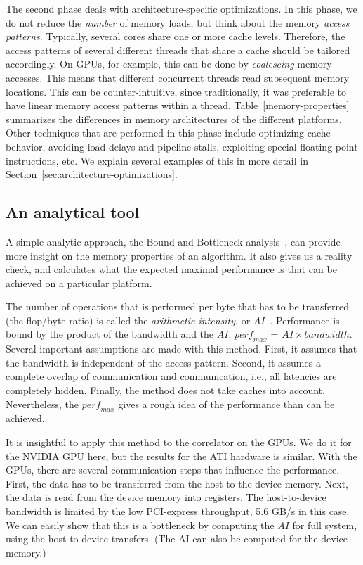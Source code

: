 \documentclass{article}
\begin{document}
The second phase deals with architecture-specific optimizations.
In this phase, we do not reduce the \emph{number} of memory loads, but think about the
memory \emph{access patterns}. Typically, several cores share one or
more cache levels. Therefore, the access patterns of several different
threads that share a cache should be tailored accordingly. On GPUs,
for example, this can be done by \emph{coalescing} memory accesses.
This means that different concurrent threads read subsequent memory
locations.  This can be counter-intuitive, since traditionally, it was
preferable to have linear memory access patterns within a
thread. Table~\ref{memory-properties} summarizes the differences in
memory architectures of the different platforms.
Other techniques that are performed in this phase include optimizing cache
behavior, avoiding load delays and pipeline stalls, exploiting special floating-point instructions, etc.
We explain several examples of this in more detail in Section~\ref{sec:architecture-optimizations}.


\subsection{An analytical tool}

A simple analytic approach, the Bound and Bottleneck
analysis~\cite{system-performance,roofline}, can provide more insight
on the memory properties of an algorithm. It also gives us a reality
check, and calculates what the expected maximal performance is that can be
achieved on a particular platform.

The number of operations that is performed per byte that has to be
transferred (the flop/byte ratio) is called the \emph{arithmetic intensity}, or
$AI$~\cite{system-performance}.  Performance is bound by the product
of the bandwidth and the $AI$: 
$\mathit{perf_{max}}$ = $AI \times bandwidth$. 
Several important assumptions are made
with this method. First, it assumes that the bandwidth is
independent of the access pattern.  Second, it assumes a complete
overlap of communication and communication, i.e., all latencies
are completely hidden.  Finally, the method does not take caches into
account. Nevertheless, the $\mathit{perf_{max}}$ gives a rough idea of
the performance than can be achieved.

It is insightful to apply this method to the correlator on the GPUs.
We do it for the NVIDIA GPU here, but the results for the ATI hardware is similar.
With the GPUs, there are several communication steps that influence
the performance. First, the data has to be transferred from the host to
the device memory.  Next, the data is read from the device memory into
registers. The host-to-device bandwidth is limited by the low
PCI-express throughput, 5.6 GB/s in this case. We can easily show that this is a bottleneck
by computing the $AI$ for full system, using the host-to-device transfers. (The AI can also be computed for
the device memory.)
 
\end{document}
